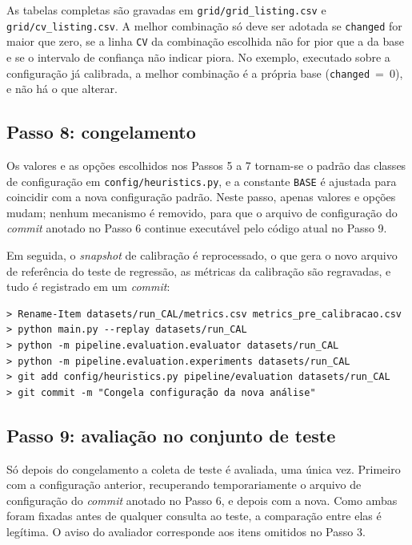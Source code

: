 As tabelas completas são gravadas em \texttt{grid/grid\_listing.csv} e
\texttt{grid/cv\_listing.csv}. A melhor combinação só deve ser adotada se
\texttt{changed} for maior que zero, se a linha \texttt{CV} da combinação
escolhida não for pior que a da base e se o intervalo de confiança não indicar
piora. No exemplo, executado sobre a configuração já calibrada, a melhor
combinação é a própria base (\texttt{changed}~=~0), e não há o que alterar.

\subsection{Passo 8: congelamento}

Os valores e as opções escolhidos nos Passos 5 a 7 tornam-se o padrão das
classes de configuração em \texttt{config/heuristics.py}, e a constante
\texttt{BASE} é ajustada para coincidir com a nova configuração padrão. Neste
passo, apenas valores e opções mudam; nenhum mecanismo é removido, para que o
arquivo de configuração do \textit{commit} anotado no Passo 6 continue
executável pelo código atual no Passo 9.

Em seguida, o \textit{snapshot} de calibração é reprocessado, o que gera o novo
arquivo de referência do teste de regressão, as métricas da calibração são
regravadas, e tudo é registrado em um \textit{commit}:

\begin{footnotesize}
\begin{verbatim}
> Rename-Item datasets/run_CAL/metrics.csv metrics_pre_calibracao.csv
> python main.py --replay datasets/run_CAL
> python -m pipeline.evaluation.evaluator datasets/run_CAL
> python -m pipeline.evaluation.experiments datasets/run_CAL
> git add config/heuristics.py pipeline/evaluation datasets/run_CAL
> git commit -m "Congela configuração da nova análise"
\end{verbatim}
\end{footnotesize}

\subsection{Passo 9: avaliação no conjunto de teste}

Só depois do congelamento a coleta de teste é avaliada, uma única vez. Primeiro
com a configuração anterior, recuperando temporariamente o arquivo de
configuração do \textit{commit} anotado no Passo 6, e depois com a nova. Como ambas foram fixadas antes de
qualquer consulta ao teste, a comparação entre elas é legítima. O aviso do
avaliador corresponde aos itens omitidos no Passo 3.

